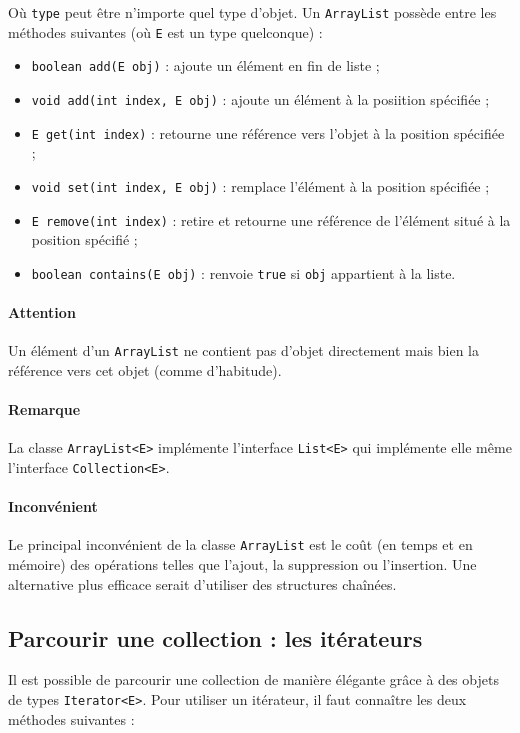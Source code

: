 Où \lstinline|type| peut être n'importe quel type d'objet. Un \lstinline|ArrayList| possède entre les
méthodes suivantes (où \lstinline|E| est un type quelconque) :

\begin{itemize}
\item \lstinline|boolean add(E obj)| : ajoute un élément en fin de liste ;
\item \lstinline|void add(int index, E obj)| : ajoute un élément à la posiition spécifiée ;
\item \lstinline|E get(int index)| : retourne une référence vers l'objet à la position spécifiée ;
\item \lstinline|void set(int index, E obj)| : remplace l'élément à la position spécifiée ;
\item \lstinline|E remove(int index)| : retire et retourne une référence de l'élément situé
à la position spécifié ;
\item \lstinline|boolean contains(E obj)| : renvoie \lstinline|true| si \lstinline|obj| appartient
à la liste.
\end{itemize}

\paragraph{Attention}
Un élément d'un \lstinline|ArrayList| ne contient pas d'objet directement mais bien
la référence vers cet objet (comme d'habitude).

\paragraph{Remarque}
La classe \lstinline|ArrayList<E>| implémente l'interface \lstinline|List<E>| qui implémente
elle même l'interface \lstinline|Collection<E>|.

\paragraph{Inconvénient}
Le principal inconvénient de la classe \lstinline{ArrayList} est le coût (en temps et en mémoire)
des opérations telles que l'ajout, la suppression ou l'insertion. Une alternative plus efficace
serait d'utiliser des structures chaînées.

\subsection{Parcourir une collection : les itérateurs}
Il est possible de parcourir une collection de manière élégante grâce à des objets
de types \lstinline|Iterator<E>|. Pour utiliser un itérateur, il faut connaître
les deux méthodes suivantes :

